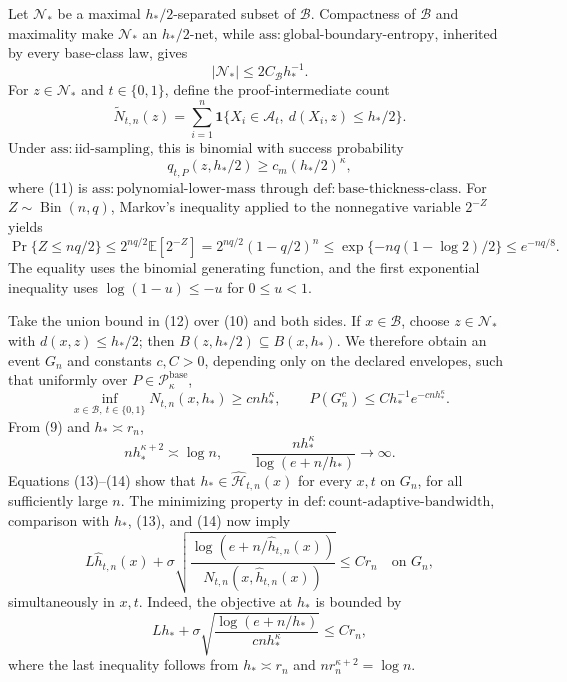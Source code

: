 Let \(\mathcal N_*\) be a maximal \(h_*/2\)-separated subset of \(\mathcal B\).  Compactness of \(\mathcal B\) and maximality make \(\mathcal N_*\) an \(h_*/2\)-net, while \(\mathrm{ass:global\text{-}boundary\text{-}entropy}\), inherited by every base-class law, gives
\[
 |\mathcal N_*|\le 2C_{\mathcal B}h_*^{-1}. \tag{10}
\]
For \(z\in\mathcal N_*\) and \(t\in\{0,1\}\), define the proof-intermediate count
\[
 \widetilde N_{t,n}(z)=\sum_{i=1}^n
 \mathbf 1\{X_i\in\mathcal A_t,\ d(X_i,z)\le h_*/2\}.
\]
Under \(\mathrm{ass:iid\text{-}sampling}\), this is binomial with success probability
\[
 q_{t,P}(z,h_*/2)\ge c_m(h_*/2)^\kappa, \tag{11}
\]
where (11) is \(\mathrm{ass:polynomial\text{-}lower\text{-}mass}\) through \(\mathrm{def:base\text{-}thickness\text{-}class}\).  For \(Z\sim\operatorname{Bin}(n,q)\), Markov's inequality applied to the nonnegative variable \(2^{-Z}\) yields
\[
 \Pr\{Z\le nq/2\}
 \le 2^{nq/2}\mathbb E[2^{-Z}]
 =2^{nq/2}(1-q/2)^n
 \le \exp\{-nq(1-\log2)/2\}\le e^{-nq/8}. \tag{12}
\]
The equality uses the binomial generating function, and the first exponential inequality uses \(\log(1-u)\le-u\) for \(0\le u<1\).

Take the union bound in (12) over (10) and both sides.  If \(x\in\mathcal B\), choose \(z\in\mathcal N_*\) with \(d(x,z)\le h_*/2\); then \(B(z,h_*/2)\subseteq B(x,h_*)\).  We therefore obtain an event \(G_n\) and constants \(c,C>0\), depending only on the declared envelopes, such that uniformly over \(P\in\mathcal P_\kappa^{\mathrm{base}}\),
\[
 \inf_{x\in\mathcal B,\ t\in\{0,1\}}N_{t,n}(x,h_*)\ge cnh_*^\kappa,\qquad
 P(G_n^c)\le Ch_*^{-1}e^{-cnh_*^\kappa}. \tag{13}
\]
From (9) and \(h_*\asymp r_n\),
\[
 nh_*^{\kappa+2}\asymp\log n,\qquad
 \frac{nh_*^\kappa}{\log(e+n/h_*)}\longrightarrow\infty. \tag{14}
\]
Equations (13)--(14) show that \(h_*\in\widehat{\mathcal H}_{t,n}(x)\) for every \(x,t\) on \(G_n\), for all sufficiently large \(n\).  The minimizing property in \(\mathrm{def:count\text{-}adaptive\text{-}bandwidth}\), comparison with \(h_*\), (13), and (14) now imply
\[
 L\widehat h_{t,n}(x)+\sigma\sqrt{\frac{\log(e+n/\widehat h_{t,n}(x))}
 {N_{t,n}(x,\widehat h_{t,n}(x))}}\le C r_n \quad\text{on }G_n, \tag{15}
\]
simultaneously in \(x,t\).  Indeed, the objective at \(h_*\) is bounded by
\[
 Lh_*+\sigma\sqrt{\frac{\log(e+n/h_*)}{cnh_*^\kappa}}\le C r_n, \tag{16}
\]
where the last inequality follows from \(h_*\asymp r_n\) and \(nr_n^{\kappa+2}=\log n\).

